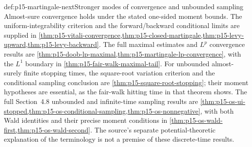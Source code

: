 \begin{proofboundary}{def:p15-martingale-next}{Stronger modes of convergence and unbounded sampling}
Almost-sure convergence holds under the stated one-sided moment bounds.
The uniform-integrability criterion and the forward/backward conditional
limits are supplied in
\cref{thm:p15-vitali-convergence,thm:p15-closed-martingale,thm:p15-levy-upward,thm:p15-levy-backward}.
The full maximal estimates and \(L^p\) convergence results are
\cref{thm:p15-doob-lp-maximal,thm:p15-martingale-lp-convergence},
with the \(L^1\) boundary in \cref{thm:p15-fair-walk-maximal-tail}.
For unbounded almost-surely finite stopping times, the square-root
variation criterion and the conditional sampling conclusion are
\cref{thm:p15-square-root-stopping}; their moment hypotheses are
essential, as the fair-walk hitting time in that theorem shows.
The full Section~4.8 unbounded and infinite-time sampling results are
\cref{thm:p15-os-ui-stopped,thm:p15-os-conditional-sampling,thm:p15-os-nonnegative}, with both Wald identities and their precise
moment conditions in \cref{thm:p15-os-wald-first,thm:p15-os-wald-second}.
The source's separate potential-theoretic explanation of the terminology
is not a premise of these discrete-time results.
\end{proofboundary}
